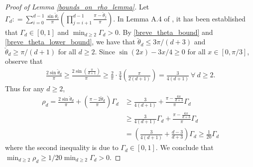 \documentclass[11pt]{article}
\theoremstyle{remark}
\begin{document}
\begin{proof}[Proof of Lemma \ref{bounds_on_rho_lemma}]
Let $\Gamma_d : = \sum_{i=0}^{d-1}\frac{\sin \breve{\theta}_i}{\pi} \left(\prod_{j=i+1}^{d-1} \frac{\pi - \breve{\theta}_j}{\pi}\right)$. In Lemma A.4 of \cite{Huangetal2018}, it has been established that $\Gamma_d \in [0,1]$ and $\min_{d \geqslant 2} \Gamma_d > 0$. By \eqref{breve_theta_bound} and \eqref{breve_theta_lower_bound}, we have that $\breve{\theta}_d \leqslant 3\pi/(d+3)$ and $\breve{\theta}_d \geqslant \pi/(d+1)$ for all $d \geqslant 2$. Since $\sin(2x) - 3x/4 \geqslant 0$ for all $x \in [0,\pi/3]$, observe that \begin{align*}
    \frac{2\sin \breve{\theta}_d}{\pi} \geqslant \frac{2\sin \left(\frac{\pi}{d+1}\right)}{\pi} \geqslant  \frac{2}{\pi}\cdot\frac{3}{4}\left(\frac{\pi}{2(d+1)}\right) = \frac{3}{4(d+1)}\ \forall\ d \geqslant 2.
\end{align*} Thus for any $d \geqslant 2$,\begin{align*}
    \rho_d = \frac{2 \sin \breve{\theta}_d}{\pi} + \left(\frac{\pi - 2 \breve{\theta}_d}{\pi}\right) \Gamma_d 
    & \geqslant \frac{3}{4(d+1)} + \frac{\pi - \frac{6\pi}{d+3}}{\pi} \Gamma_d \\
    & \geqslant \frac{3}{4(d+1)} \Gamma_d + \frac{\pi - \frac{6\pi}{d+3}}{\pi} \Gamma_d \\
    & = \left(\frac{3}{4(d+1)} + \frac{d-3}{d+3}\right)\Gamma_d  \geqslant \frac{1}{20}\Gamma_d
\end{align*}  where the second inequality is due to $\Gamma_d \in [0,1]$. We conclude that $\min_{d \geqslant 2} \rho_d \geqslant 1/20 \min_{d \geqslant 2} \Gamma_d > 0.$


\end{proof}
\end{document}
